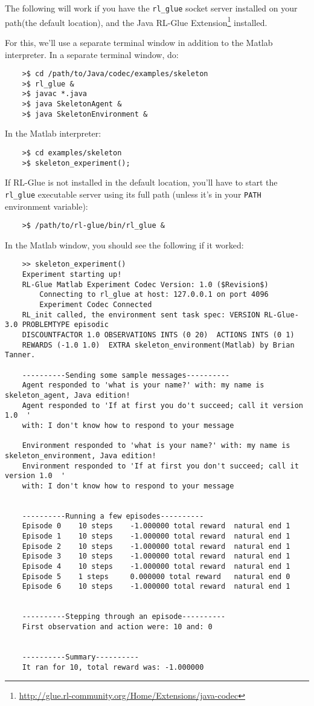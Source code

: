 \documentclass[11pt]{article}
\begin{document}
The following will work if you have the \texttt{rl\_glue} socket server installed on your path(the default location), and the Java RL-Glue Extension\footnote{\url{http://glue.rl-community.org/Home/Extensions/java-codec}} installed.

For this, we'll use a separate terminal window in addition to the Matlab interpreter.  In a separate terminal window, do:
\begin{verbatim}
	>$ cd /path/to/Java/codec/examples/skeleton
	>$ rl_glue &
	>$ javac *.java
	>$ java SkeletonAgent &
	>$ java SkeletonEnvironment &
\end{verbatim}

In the Matlab interpreter:
\begin{verbatim}
	>$ cd examples/skeleton
	>$ skeleton_experiment();
\end{verbatim}

If RL-Glue is not installed in the default location, you'll have to start the \texttt{rl\_glue} executable server using its full path (unless it's in your \texttt{PATH} environment variable):
\begin{verbatim}
	>$ /path/to/rl-glue/bin/rl_glue &
\end{verbatim}

In the Matlab window, you should see the following if it worked:
\begin{verbatim}
	>> skeleton_experiment()
	Experiment starting up!
	RL-Glue Matlab Experiment Codec Version: 1.0 ($Revision$)
	    Connecting to rl_glue at host: 127.0.0.1 on port 4096
	    Experiment Codec Connected
	RL_init called, the environment sent task spec: VERSION RL-Glue-3.0 PROBLEMTYPE episodic 
	DISCOUNTFACTOR 1.0 OBSERVATIONS INTS (0 20)  ACTIONS INTS (0 1) 
	REWARDS (-1.0 1.0)  EXTRA skeleton_environment(Matlab) by Brian Tanner.

	----------Sending some sample messages----------
	Agent responded to 'what is your name?' with: my name is skeleton_agent, Java edition!
	Agent responded to 'If at first you do't succeed; call it version 1.0  ' 
	with: I don't know how to respond to your message

	Environment responded to 'what is your name?' with: my name is skeleton_environment, Java edition!
	Environment responded to 'If at first you don't succeed; call it version 1.0  ' 
	with: I don't know how to respond to your message


	----------Running a few episodes----------
	Episode 0	 10 steps 	 -1.000000 total reward	 natural end 1
	Episode 1	 10 steps 	 -1.000000 total reward	 natural end 1
	Episode 2	 10 steps 	 -1.000000 total reward	 natural end 1
	Episode 3	 10 steps 	 -1.000000 total reward	 natural end 1
	Episode 4	 10 steps 	 -1.000000 total reward	 natural end 1
	Episode 5	 1 steps 	 0.000000 total reward	 natural end 0
	Episode 6	 10 steps 	 -1.000000 total reward	 natural end 1


	----------Stepping through an episode----------
	First observation and action were: 10 and: 0


	----------Summary----------
	It ran for 10, total reward was: -1.000000
\end{verbatim}
\end{document}

